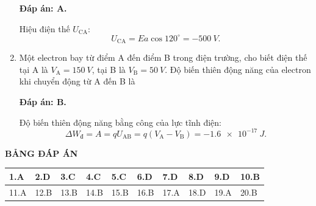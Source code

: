 \begin{enumerate}[label=\bfseries Câu \arabic*:]
{	}
	\loigiai
	{	\textbf{Đáp án: A.}
		
		Hiệu điện thế $U_\text{CA}$:
		$$U_\text{CA} = Ea \cos 120^\circ = \SI{-500}{V}.$$
	}
	\item {}
	
	\cauhoi
	{Một electron bay từ điểm A đến điểm B trong điện trường, cho biết điện thế tại A là $V_\text{A} = \SI{150}{V}$, tại B là $V_\text{B} = \SI{50}{V}$. Độ biến thiên động năng của electron khi chuyển động từ A đến B là
		
	}
	\loigiai
	{	\textbf{Đáp án: B.}
		
		Độ biến thiên động năng bằng công của lực tĩnh điện:
		$$\Delta W_\text{đ} = A = qU_\text{AB} = q(V_\text{A} - V_\text{B}) = \SI{-1.6e-17}{J}.$$
	}
\end{enumerate}

\whiteBGstarEnd

\loigiai
{
	\begin{center}
		\textbf{BẢNG ĐÁP ÁN}
	\end{center}
	\begin{center}
		\begin{tabular}{|m{2.8em}|m{2.8em}|m{2.8em}|m{2.8em}|m{2.8em}|m{2.8em}|m{2.8em}|m{2.8em}|m{2.8em}|m{2.8em}|}
			\hline
			1.A  & 2.D  & 3.C  & 4.C  & 5.C  & 6.D  & 7.D  & 8.D  & 9.D  & 10.B  \\
			\hline
			11.A  & 12.B  & 13.B  & 14.B  & 15.B  & 16.B  & 17.A  & 18.D  & 19.A  & 20.B  \\
			\hline
		\end{tabular}
	\end{center}
}
